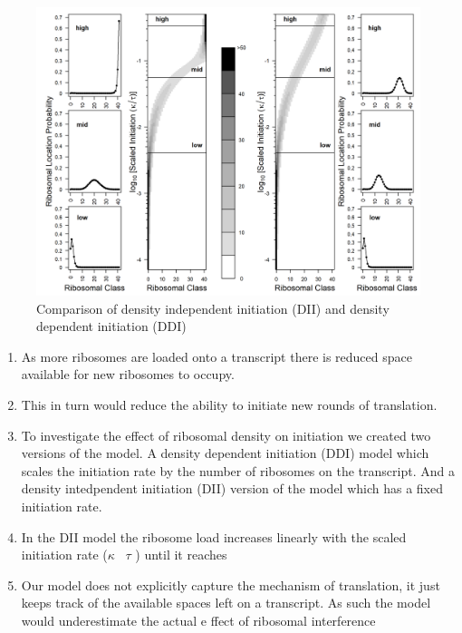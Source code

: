 \documentclass[review]{elsarticle}
\begin{document}
\begin{figure}[ht]
\centering
\includegraphics[width=\textwidth]{Images/2022-10-21_Figure1_DIIvsDDI_medianlength_low_marking.png}
\caption{Comparison of density independent initiation (DII) and density dependent initiation (DDI)}
\end{figure}


\begin{enumerate}
	\item  As more ribosomes are loaded onto a transcript there is reduced space available for new ribosomes to occupy.
	\item This in turn would reduce the ability to initiate new rounds of translation.
	\item To investigate the effect of ribosomal density on initiation we created two versions of the model. A density dependent initiation (DDI) model which scales the initiation rate by the number of ribosomes on the transcript. And a density intedpendent initiation (DII) version of the model which has a fixed initiation rate.
	\item In the DII model the ribosome load increases linearly with the scaled initiation rate ($\kappa$ \ $\tau$ ) until it reaches 
	\item Our model does not explicitly capture the mechanism of translation, it just keeps track of the available spaces left on a transcript. As such the model would underestimate the actual e ffect of ribosomal interference

\end{enumerate}
\end{document}

